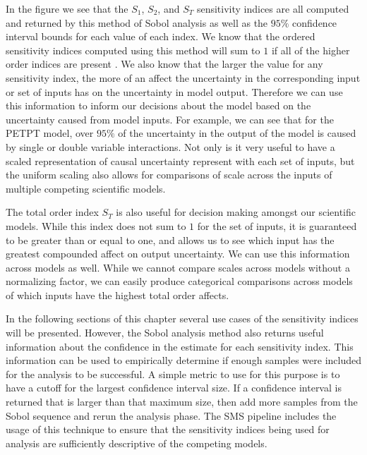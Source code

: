 In the figure we see that the $S_1$, $S_2$, and $S_T$ sensitivity indices are all computed and returned by this method of Sobol analysis as well as the $95\%$ confidence interval bounds for each value of each index.
We know that the ordered sensitivity indices computed using this method will sum to $1$ if all of the higher order indices are present \citep{sobol2001globalSA}.
We also know that the larger the value for any sensitivity index, the more of an affect the uncertainty in the corresponding input or set of inputs has on the uncertainty in model output.
Therefore we can use this information to inform our decisions about the model based on the uncertainty caused from model inputs.
For example, we can see that for the PETPT model, over $95\%$ of the uncertainty in the output of the model is caused by single or double variable interactions.
Not only is it very useful to have a scaled representation of causal uncertainty represent with each set of inputs, but the uniform scaling also allows for comparisons of scale across the inputs of multiple competing scientific models.

The total order index $S_T$ is also useful for decision making amongst our scientific models.
While this index does not sum to $1$ for the set of inputs, it is guaranteed to be greater than or equal to one, and allows us to see which input has the greatest compounded affect on output uncertainty.
We can use this information across models as well.
While we cannot compare scales across models without a normalizing factor, we can easily produce categorical comparisons across models of which inputs have the highest total order affects.

In the following sections of this chapter several use cases of the sensitivity indices will be presented.
However, the Sobol analysis method also returns useful information about the confidence in the estimate for each sensitivity index.
This information can be used to empirically determine if enough samples were included for the analysis to be successful.
A simple metric to use for this purpose is to have a cutoff for the largest confidence interval size.
If a confidence interval is returned that is larger than that maximum size, then add more samples from the Sobol sequence and rerun the analysis phase.
The SMS pipeline includes the usage of this technique to ensure that the sensitivity indices being used for analysis are sufficiently descriptive of the competing models.

